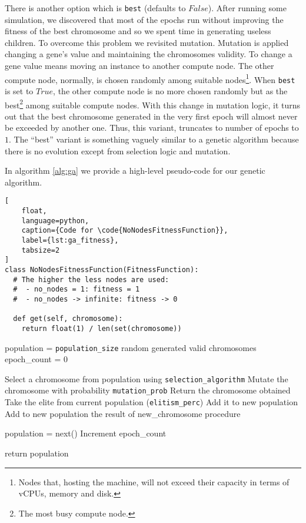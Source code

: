 There is another option which is \texttt{best} (defaults to $False$). After running some simulation, we discovered that most of the epochs run without improving the fitness of the best chromosome and so we spent time in generating useless children. To overcome this problem we revisited mutation. Mutation is applied changing a gene's value and maintaining the chromosomes validity. To change a gene value means moving an instance to another compute node. The other compute node, normally, is chosen randomly among suitable nodes\footnote{Nodes that, hosting the machine, will not exceed their capacity in terms of vCPUs, memory and disk.}. When \texttt{best} is set to $True$, the other compute node is no more chosen randomly but as the best\footnote{The most busy compute node.} among suitable compute nodes. With this change in mutation logic, it turns out that the best chromosome generated in the very first epoch will almost never be exceeded by another one. Thus, this variant, truncates to number of epochs to $1$. The ``best'' variant is something vaguely similar to a genetic algorithm because there is no evolution except from selection logic and mutation.

In algorithm \ref{alg:ga} we provide a high-level pseudo-code for our genetic algorithm.

\begin{lstlisting}[
	float,
	language=python,
	caption={Code for \code{NoNodesFitnessFunction}},
	label={lst:ga_fitness},
	tabsize=2
]
class NoNodesFitnessFunction(FitnessFunction):
  # The higher the less nodes are used:
  #  - no_nodes = 1: fitness = 1
  #  - no_nodes -> infinite: fitness -> 0

  def get(self, chromosome):
    return float(1) / len(set(chromosome))
\end{lstlisting}

\begin{algorithm}[H]
\caption{Pseudo-code for our genetic algorithm}
\label{alg:ga}
\begin{algorithmic}[0]
	\State population = \texttt{population\_size} random generated valid chromosomes
	\State epoch\_count = 0
	\State

		\State Select a chromosome from population using \texttt{selection\_algorithm}
		\State Mutate the chromosome with probability \texttt{mutation\_prob}
		\State Return the chromosome obtained
	\EndProcedure
	\State
		\State Take the elite from current population (\texttt{elitism\_perc})
		\State Add it to new population
			\State Add to new population the result of new\_chromosome procedure
		\EndWhile
	\EndProcedure
	\State

		\State population = next()
		\State Increment epoch\_count
	\EndWhile

	\State
	\State return population
\end{algorithmic}
\end{algorithm}

